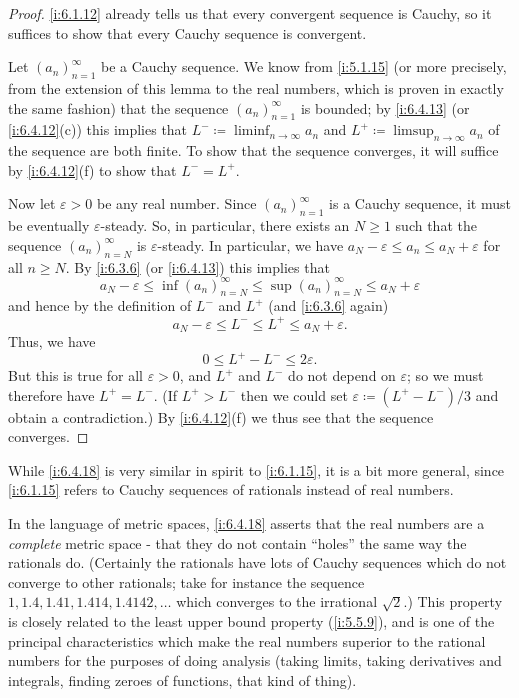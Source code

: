 \begin{proof}
  \cref{i:6.1.12} already tells us that every convergent sequence is Cauchy, so it suffices to show that every Cauchy sequence is convergent.

  Let \((a_n)_{n = 1}^\infty\) be a Cauchy sequence.
  We know from \cref{i:5.1.15} (or more precisely, from the extension of this lemma to the real numbers, which is proven in exactly the same fashion) that the sequence \((a_n)_{n = 1}^\infty\) is bounded;
  by \cref{i:6.4.13} (or \cref{i:6.4.12}(c)) this implies that \(L^- \coloneqq \liminf_{n \to \infty} a_n\) and \(L^+ \coloneqq \limsup_{n \to \infty} a_n\) of the sequence are both finite.
  To show that the sequence converges, it will suffice by \cref{i:6.4.12}(f) to show that \(L^- = L^+\).

  Now let \(\varepsilon > 0\) be any real number.
  Since \((a_n)_{n = 1}^\infty\) is a Cauchy sequence, it must be eventually \(\varepsilon\)-steady.
  So, in particular, there exists an \(N \geq 1\) such that the sequence \((a_n)_{n = N}^\infty\) is \(\varepsilon\)-steady.
  In particular, we have \(a_N - \varepsilon \leq a_n \leq a_N + \varepsilon\) for all \(n \geq N\).
  By \cref{i:6.3.6} (or \cref{i:6.4.13}) this implies that
  \[
    a_N - \varepsilon \leq \inf(a_n)_{n = N}^\infty \leq \sup(a_n)_{n = N}^\infty \leq a_N + \varepsilon
  \]
  and hence by the definition of \(L^-\) and \(L^+\) (and \cref{i:6.3.6} again)
  \[
    a_N - \varepsilon \leq L^- \leq L^+ \leq a_N + \varepsilon.
  \]
  Thus, we have
  \[
    0 \leq L^+ - L^- \leq 2\varepsilon.
  \]
  But this is true for all \(\varepsilon > 0\), and \(L^+\) and \(L^-\) do not depend on \(\varepsilon\);
  so we must therefore have \(L^+ = L^-\).
  (If \(L^+ > L^-\) then we could set \(\varepsilon \coloneqq (L^+ - L^-) / 3\) and obtain a contradiction.)
  By \cref{i:6.4.12}(f) we thus see that the sequence converges.
\end{proof}

\begin{rmk}\label{i:6.4.19}
  While \cref{i:6.4.18} is very similar in spirit to \cref{i:6.1.15}, it is a bit more general, since \cref{i:6.1.15} refers to Cauchy sequences of rationals instead of real numbers.
\end{rmk}

\begin{rmk}\label{i:6.4.20}
  In the language of metric spaces, \cref{i:6.4.18} asserts that the real numbers are a \emph{complete} metric space
  - that they do not contain ``holes'' the same way the rationals do.
  (Certainly the rationals have lots of Cauchy sequences which do not converge to other rationals;
  take for instance the sequence \(1, 1.4, 1.41, 1.414, 1.4142, \dots\) which converges to the irrational \(\sqrt{2}\).)
  This property is closely related to the least upper bound property (\cref{i:5.5.9}), and is one of the principal characteristics which make the real numbers superior to the rational numbers for the purposes of doing analysis
  (taking limits, taking derivatives and integrals, finding zeroes of functions, that kind of thing).
\end{rmk}

